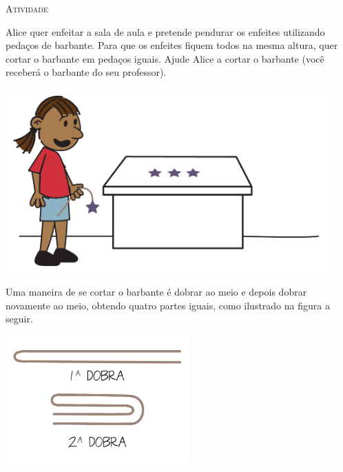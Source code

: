 \documentclass[10 pt,usenames,dvipsnames, oneside]{article}
\begin{document}
\bigskip
\begin{center}
{\large \scshape Atividade}
\end{center}
\fi

Alice quer enfeitar a sala de aula e pretende pendurar os enfeites utilizando pedaços de barbante. Para que os enfeites fiquem todos na mesma altura, quer cortar o barbante em pedaços iguais. Ajude Alice a cortar o barbante (você receberá o barbante do seu professor).

\begin{center}
    \includegraphics[width=350pt, keepaspectratio]{ativ3_fig01.png}
  \end{center}

\ifdefined\prof

\begin{solucao}

Uma maneira de se cortar o barbante é dobrar ao meio e depois dobrar novamente ao meio, obtendo quatro partes iguais, como ilustrado na figura a seguir.
  \begin{center}
  \includegraphics[width=200pt, keepaspectratio]{ativ3_fig03.png}
  \end{center}

\end{solucao}
\fi
\end{document}
